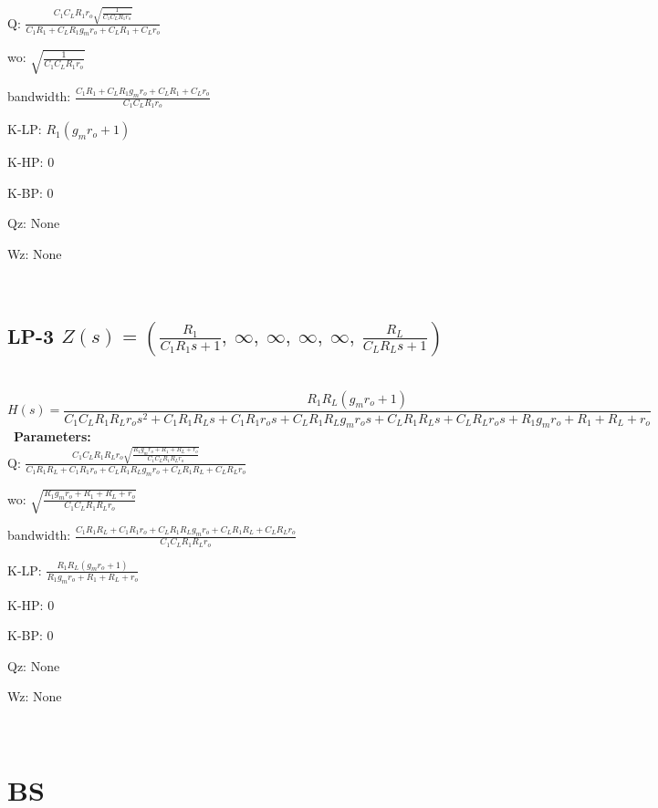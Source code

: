 \documentclass{article}
\begin{document}
Q: $\frac{C_{1} C_{L} R_{1} r_{o} \sqrt{\frac{1}{C_{1} C_{L} R_{1} r_{o}}}}{C_{1} R_{1} + C_{L} R_{1} g_{m} r_{o} + C_{L} R_{1} + C_{L} r_{o}}$\ 

wo: $\sqrt{\frac{1}{C_{1} C_{L} R_{1} r_{o}}}$\ 

bandwidth: $\frac{C_{1} R_{1} + C_{L} R_{1} g_{m} r_{o} + C_{L} R_{1} + C_{L} r_{o}}{C_{1} C_{L} R_{1} r_{o}}$\ 

K-LP: $R_{1} \left(g_{m} r_{o} + 1\right)$\ 

K-HP: $0$\ 

K-BP: $0$\ 

Qz: $\text{None}$\ 

Wz: $\text{None}$\ 

\ 

\subsection{LP-3 $Z(s) = \left( \frac{R_{1}}{C_{1} R_{1} s + 1}, \  \infty, \  \infty, \  \infty, \  \infty, \  \frac{R_{L}}{C_{L} R_{L} s + 1}\right)$ } \ 
\textbf{\[H(s) = \frac{R_{1} R_{L} \left(g_{m} r_{o} + 1\right)}{C_{1} C_{L} R_{1} R_{L} r_{o} s^{2} + C_{1} R_{1} R_{L} s + C_{1} R_{1} r_{o} s + C_{L} R_{1} R_{L} g_{m} r_{o} s + C_{L} R_{1} R_{L} s + C_{L} R_{L} r_{o} s + R_{1} g_{m} r_{o} + R_{1} + R_{L} + r_{o}}\] } \ 
\textbf{Parameters:}\\ 

Q: $\frac{C_{1} C_{L} R_{1} R_{L} r_{o} \sqrt{\frac{R_{1} g_{m} r_{o} + R_{1} + R_{L} + r_{o}}{C_{1} C_{L} R_{1} R_{L} r_{o}}}}{C_{1} R_{1} R_{L} + C_{1} R_{1} r_{o} + C_{L} R_{1} R_{L} g_{m} r_{o} + C_{L} R_{1} R_{L} + C_{L} R_{L} r_{o}}$\ 

wo: $\sqrt{\frac{R_{1} g_{m} r_{o} + R_{1} + R_{L} + r_{o}}{C_{1} C_{L} R_{1} R_{L} r_{o}}}$\ 

bandwidth: $\frac{C_{1} R_{1} R_{L} + C_{1} R_{1} r_{o} + C_{L} R_{1} R_{L} g_{m} r_{o} + C_{L} R_{1} R_{L} + C_{L} R_{L} r_{o}}{C_{1} C_{L} R_{1} R_{L} r_{o}}$\ 

K-LP: $\frac{R_{1} R_{L} \left(g_{m} r_{o} + 1\right)}{R_{1} g_{m} r_{o} + R_{1} + R_{L} + r_{o}}$\ 

K-HP: $0$\ 

K-BP: $0$\ 

Qz: $\text{None}$\ 

Wz: $\text{None}$\ 

\ 

\section{BS}\ 
\end{document}
